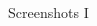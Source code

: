 \documentclass{beamer}
\begin{document}
\begin{frame}{Screenshots I}
\begin{columns}[onlytextwidth]
\begin{column}{0.5\textwidth}
			\end{column}
			\begin{column}{0.5\textwidth}
				\centering
			\end{column}
		\end{columns}
	\end{frame}
	
\end{document}
